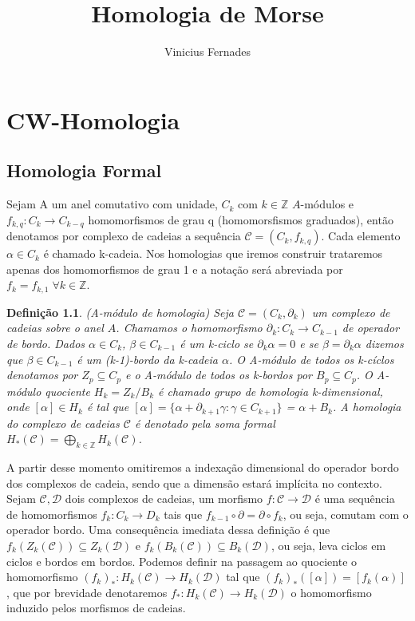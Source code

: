 \documentclass[12pt]{book}
\newtheorem{definicao}[teorema]{Definição}
\begin{document}
	
	\title{Homologia de Morse}
	
	\author{Vinicius Fernades}
	
	\maketitle
	
	\tableofcontents
	
	\chapter{CW-Homologia}
	\section{Homologia Formal}
	Sejam A um anel comutativo com unidade, $C_{k}$ com $k \in \mathbb{Z}$ $A$-módulos e $f_{k,q}: C_{k} \to C_{k-q} $ homomorfismos de grau q (homomorsfismos graduados), então denotamos por complexo de cadeias a sequência $\mathcal{C} = (C_{k}, f_{k,q})$. Cada elemento $\alpha \in C_{k}$ é chamado k-cadeia. Nos homologias que iremos construir trataremos apenas dos homomorfismos de grau 1 e a notação será abreviada por $f_{k} = f_{k,1} \; \forall k \in \mathbb{Z}$.
	
	\begin{definicao}
		(A-módulo de homologia) Seja $\mathcal{C} = (C_{k}, \partial_{k})$ um complexo de cadeias sobre o anel $A$. Chamamos o homomorfismo $\partial_{k}: C_{k} \to C_{k-1} $ de operador de bordo. Dados $\alpha \in C_{k}$, $\beta \in C_{k-1}$  é um k-ciclo se $\partial_{k }\alpha=0$ e se $\beta =  \partial_{k }\alpha$ dizemos que $\beta \in C_{k-1}$ é um (k-1)-bordo da k-cadeia $\alpha$. O A-módulo de todos os k-cíclos denotamos por $Z_{p} \subseteq C_{p}$ e o  A-módulo de todos os k-bordos por $B_{p} \subseteq C_{p}$. O A-módulo quociente $H_{k} = Z_{k} / B_{k}$ é chamado grupo de homologia k-dimensional, onde $[\alpha] \in H_{k}$ é tal que $[\alpha] = \{\alpha+\partial_{k+1}\gamma :\gamma \in  C_{k+1}\}$ = $\alpha + B_{k}$. A homologia do complexo de cadeias $\mathcal{C}$ é denotado pela soma formal $H_{*}(\mathcal{C}) = \bigoplus_{k \in \mathbb{Z}} H_{k}(\mathcal{C})$.
	\end{definicao}
	
	A partir desse momento omitiremos a indexação dimensional do operador bordo dos complexos de cadeia, sendo que a dimensão estará implícita no contexto. Sejam $\mathcal{C}, \mathcal{D}$ dois complexos de cadeias, um morfismo $f: \mathcal{C} \to \mathcal{D}$ é uma sequência de homomorfismos $f_{k}: C_{k} \to D_{k}$ tais que $f_{k-1}\circ\partial = \partial\circ f_{k}$, ou seja, comutam com o operador bordo. Uma consequência imediata dessa definição é que $f_{k}(Z_{k}(\mathcal{C})) \subseteq Z_{k}(\mathcal{D})$ e $f_{k}(B_{k}(\mathcal{C})) \subseteq B_{k}(\mathcal{D})$, ou seja, leva ciclos em ciclos e bordos em bordos. Podemos definir na passagem ao quociente o homomorfismo $(f_{k})_{*}:H_{k}(\mathcal{C}) \to H_{k}(\mathcal{D})$ tal que $(f_{k})_{*}([\alpha]) = [f_{k}(\alpha)]$, que por brevidade denotaremos $f_{*}:H_{k}(\mathcal{C}) \to H_{k}(\mathcal{D})$ o homomorfismo induzido pelos morfismos de cadeias.
	
\end{document}
